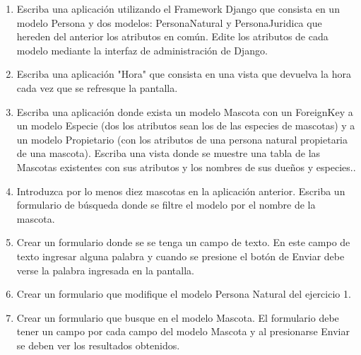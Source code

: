 \begin{enumerate}
\item Escriba una aplicación utilizando el Framework Django que consista en un modelo Persona y dos modelos: PersonaNatural y PersonaJuridica que hereden del anterior los atributos en común. Edite los atributos de cada modelo mediante la interfaz de administración de Django.

\item Escriba una aplicación "Hora" que consista en una vista que devuelva la hora cada vez que se refresque la pantalla.

\item Escriba una aplicación donde exista un modelo Mascota con un ForeignKey a un modelo Especie (dos los atributos sean los de las especies de mascotas) y a un modelo Propietario (con los atributos de una persona natural propietaria de una mascota). Escriba una vista donde se muestre una tabla de las Mascotas existentes con sus atributos y los nombres de sus dueños y especies..

\item Introduzca por lo menos diez mascotas en la aplicación anterior. Escriba un formulario de búsqueda donde se filtre el modelo por el nombre de la mascota.

\item Crear un formulario donde se se tenga un campo de texto. En este campo de texto ingresar alguna palabra y cuando se presione el botón de Enviar debe verse la palabra ingresada en la pantalla.

\item Crear un formulario que modifique el modelo Persona Natural del ejercicio 1.

\item Crear un formulario que busque en el modelo Mascota. El formulario debe tener un campo por cada campo del modelo Mascota y al presionarse Enviar se deben ver los resultados obtenidos.
\end{enumerate}



